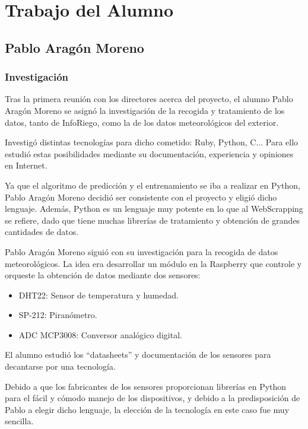 \cleardoublepage

\chapter{Trabajo del Alumno}
\label{makereference11}

\section{Pablo Aragón Moreno}
\subsection{Investigación}
Tras la primera reunión con los directores acerca del proyecto, el alumno Pablo Aragón Moreno se asignó la investigación de la recogida y tratamiento de los datos, tanto de InfoRiego, como la de los datos meteorológicos del exterior.

Investigó distintas tecnologías para dicho cometido: Ruby, Python, C... Para ello estudió estas posibilidades mediante su documentación, experiencia y opiniones en Internet.

Ya que el algoritmo de predicción y el entrenamiento se iba a realizar en Python, Pablo Aragón Moreno decidió ser consistente con el proyecto y eligió dicho lenguaje. Además, Python es un lenguaje muy potente en lo que al WebScrapping se refiere, dado que tiene muchas librerías de tratamiento y obtención de grandes cantidades de datos.

Pablo Aragón Moreno siguió con su investigación para la recogida de datos meteorológicos. La idea era desarrollar un módulo en la Raspberry que controle y orqueste la obtención de datos mediante dos sensores:

\begin{itemize}
\item DHT22: Sensor de temperatura y humedad.
\item SP-212: Piranómetro.
\item ADC MCP3008: Conversor analógico digital.
\end{itemize}

El alumno estudió los ``datasheets'' y documentación de los sensores para decantarse por una tecnología.

Debido a que los fabricantes de los sensores proporcionan librerías en Python para el fácil y cómodo manejo de los dispositivos, y debido a la predisposición de Pablo a elegir dicho lenguaje, la elección de la tecnología en este caso fue muy sencilla.

